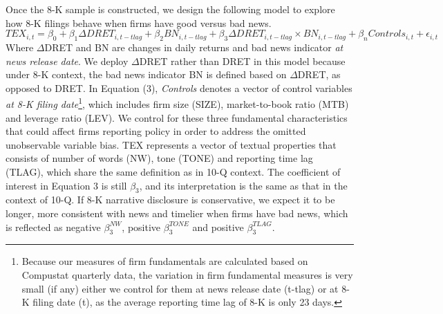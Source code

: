 \documentclass[a4paper]{article}
\begin{document}
\begin{spacing}{2}
Once the 8-K sample is constructed, we design the following model to explore how 8-K filings behave when firms have good versus bad news.
\begin{equation} \label{eq3}
TEX_{i,t}=\beta_0+\beta_1\Delta DRET_{i,t-tlag}+\beta_2BN_{i,t-tlag}+\beta_3\Delta DRET_{i,t-tlag}\times BN_{i,t-tlag}+\beta_nControls_{i,t}+\epsilon_{i,t}
\end{equation}
Where $\Delta$DRET and BN are changes in daily returns and bad news indicator \textit{at news release date}. We deploy $\Delta$DRET rather than DRET in this model because under 8-K context, the bad news indicator BN is defined based on $\Delta$DRET, as opposed to DRET. In Equation (3), \textit{Controls} denotes a vector of control variables \textit{at 8-K filing date}\footnote{Because our measures of firm fundamentals are calculated based on Compustat quarterly data, the variation in firm fundamental measures is very small (if any) either we control for them at news release date (t-tlag) or at 8-K filing date (t), as the average reporting time lag of 8-K is only 23 days.}, which includes firm size (SIZE), market-to-book ratio (MTB) and leverage ratio (LEV). We control for these three fundamental characteristics that could affect firms reporting policy in order to address the omitted unobservable variable bias. TEX represents a vector of textual properties that consists of number of words (NW), tone (TONE) and reporting time lag (TLAG), which share the same definition as in 10-Q context. The coefficient of interest in Equation 3 is still $\beta_3$, and its interpretation is the same as that in the context of 10-Q. If 8-K narrative disclosure is conservative, we expect it to be longer, more consistent with news and timelier when firms have bad news, which is reflected as negative $\beta_3^{NW}$, positive  $\beta_3^{TONE}$ and positive $\beta_3^{TLAG}$.


\end{spacing}
\end{document}
